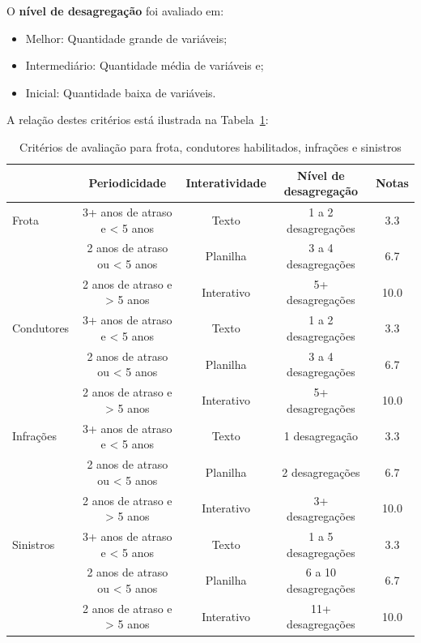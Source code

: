 \documentclass[
  a4paper,
]{article}
\begin{document}
O \textbf{nível de desagregação} foi avaliado em:

\begin{itemize}
\item
  Melhor: Quantidade grande de variáveis;
\item
  Intermediário: Quantidade média de variáveis e;
\item
  Inicial: Quantidade baixa de variáveis.
\end{itemize}

A relação destes critérios está ilustrada na Tabela~\ref{tbl-criterios}:

\begin{longtable}{l|cccc}

\caption{\label{tbl-criterios}Critérios de avaliação para frota,
condutores habilitados, infrações e sinistros}

\tabularnewline

\toprule
\multicolumn{1}{l}{} & Periodicidade & Interatividade & Nível de desagregação & Notas \\ 
\midrule\addlinespace[2.5pt]
Frota & 3+ anos de atraso e < 5 anos & Texto & 1 a 2 desagregações & 3.3 \\ 
 & 2 anos de atraso ou < 5 anos & Planilha & 3 a 4 desagregações & 6.7 \\ 
 & 2 anos de atraso e > 5 anos & Interativo & 5+ desagregações & 10.0 \\ 
\midrule\addlinespace[2.5pt]
Condutores & 3+ anos de atraso e < 5 anos & Texto & 1 a 2 desagregações & 3.3 \\ 
 & 2 anos de atraso ou < 5 anos & Planilha & 3 a 4 desagregações & 6.7 \\ 
 & 2 anos de atraso e > 5 anos & Interativo & 5+ desagregações & 10.0 \\ 
\midrule\addlinespace[2.5pt]
Infrações & 3+ anos de atraso e < 5 anos & Texto & 1 desagregação & 3.3 \\ 
 & 2 anos de atraso ou < 5 anos & Planilha & 2 desagregações & 6.7 \\ 
 & 2 anos de atraso e > 5 anos & Interativo & 3+ desagregações & 10.0 \\ 
\midrule\addlinespace[2.5pt]
Sinistros & 3+ anos de atraso e < 5 anos & Texto & 1 a 5 desagregações & 3.3 \\ 
 & 2 anos de atraso ou < 5 anos & Planilha & 6 a 10 desagregações & 6.7 \\ 
 & 2 anos de atraso e > 5 anos & Interativo & 11+ desagregações & 10.0 \\ 
\bottomrule

\end{longtable}
\end{document}
